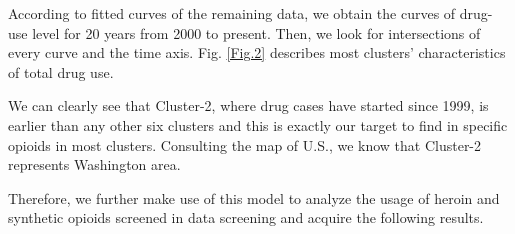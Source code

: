 \documentclass[12pt]{article}
\begin{document}

According to fitted curves of the remaining data, we obtain the curves of drug-use level for 20 years from 2000 to present. Then, we look for intersections of every curve and the time axis. Fig. \ref{Fig.2} describes most clusters’ characteristics of total drug use.

We can clearly see that Cluster-2, where drug cases have started since 1999, is earlier than any other six clusters and this is exactly our target to find in specific opioids in most clusters. Consulting the map of U.S., we know that Cluster-2 represents Washington area.

Therefore, we further make use of this model to analyze the usage of heroin and synthetic opioids screened in data screening and acquire the following results.
\end{document}
